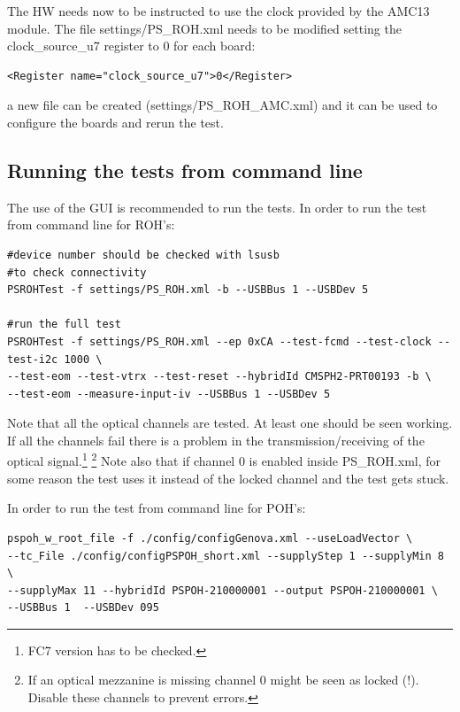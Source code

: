 \documentclass[10pt,a4paper]{article}
\begin{document}
The HW needs now to be instructed to use the clock provided by the AMC13 module. The file settings/PS\_ROH.xml needs to be modified setting the clock\_source\_u7 register to 0 for each board:
\begin{framed}
\begin{verbatim}
<Register name="clock_source_u7">0</Register>
\end{verbatim}
\end{framed}
a new file can be created (settings/PS\_ROH\_AMC.xml) and it can be used to configure the boards and rerun the test.


\subsection{Running the tests from command line}
The use of the GUI is recommended to run the tests. 
In order to run the test from command line for ROH's:
\begin{framed}
\begin{verbatim}
#device number should be checked with lsusb
#to check connectivity
PSROHTest -f settings/PS_ROH.xml -b --USBBus 1 --USBDev 5 

#run the full test
PSROHTest -f settings/PS_ROH.xml --ep 0xCA --test-fcmd --test-clock --test-i2c 1000 \
--test-eom --test-vtrx --test-reset --hybridId CMSPH2-PRT00193 -b \
--test-eom --measure-input-iv --USBBus 1 --USBDev 5
\end{verbatim}
\end{framed}
Note that all the optical channels are tested. At least one should be seen working.
If all the channels fail there is a problem in the transmission/receiving of the optical signal.\footnote[1]{FC7 version has to be checked.}
\footnote[2]{If an optical mezzanine is missing channel 0 might be seen as locked (!). Disable these channels to prevent errors.}
Note also that if channel 0 is enabled inside PS\_ROH.xml, for some reason the test uses it instead of the locked channel and the test gets stuck.  

In order to run the test from command line for POH's:
\begin{framed}
\begin{verbatim}
pspoh_w_root_file -f ./config/configGenova.xml --useLoadVector \
--tc_File ./config/configPSPOH_short.xml --supplyStep 1 --supplyMin 8 \
--supplyMax 11 --hybridId PSPOH-210000001 --output PSPOH-210000001 \
--USBBus 1  --USBDev 095
\end{verbatim}
\end{framed}
\end{document}
